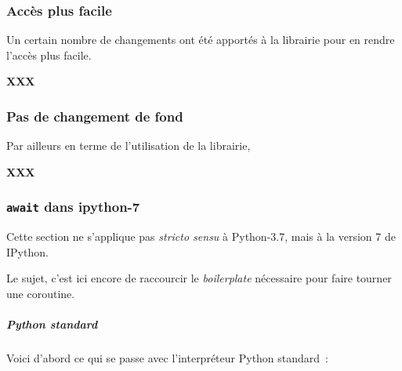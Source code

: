     \hypertarget{accuxe8s-plus-facile}{%
\subsubsection{Accès plus facile}\label{accuxe8s-plus-facile}}

    Un certain nombre de changements ont été apportés à la librairie pour en
rendre l'accès plus facile.

\textbf{XXX}

    \hypertarget{pas-de-changement-de-fond}{%
\subsubsection{Pas de changement de
fond}\label{pas-de-changement-de-fond}}

    Par ailleurs en terme de l'utilisation de la librairie,

\textbf{XXX}

    \hypertarget{await-dans-ipython-7}{%
\subsubsection{\texorpdfstring{\texttt{await} dans
ipython-7}{await dans ipython-7}}\label{await-dans-ipython-7}}

Cette section ne s'applique pas \emph{stricto sensu} à Python-3.7, mais
à la version 7 de IPython.

Le sujet, c'est ici encore de raccourcir le \emph{boilerplate}
nécessaire pour faire tourner une coroutine.

    \hypertarget{python-standard}{%
\subparagraph{Python standard}\label{python-standard}}

    Voici d'abord ce qui se passe avec l'interpréteur Python standard~:

    \begin{Shaded}
\begin{Highlighting}[frame=lines,framerule=0.6mm,rulecolor=\color{asisframecolor}]
 \NormalTok{, }\NormalTok{:}\NormalTok{:}\NormalTok{)}
\NormalTok{[Clang }\NormalTok{)] on darwin}
\NormalTok{, }\NormalTok{, }   
\OperatorTok{>>>} 
\OperatorTok{>>>}  
\OperatorTok{>>>} \NormalTok{, }\NormalTok{))}
\NormalTok{: }
\end{Highlighting}
\end{Shaded}

